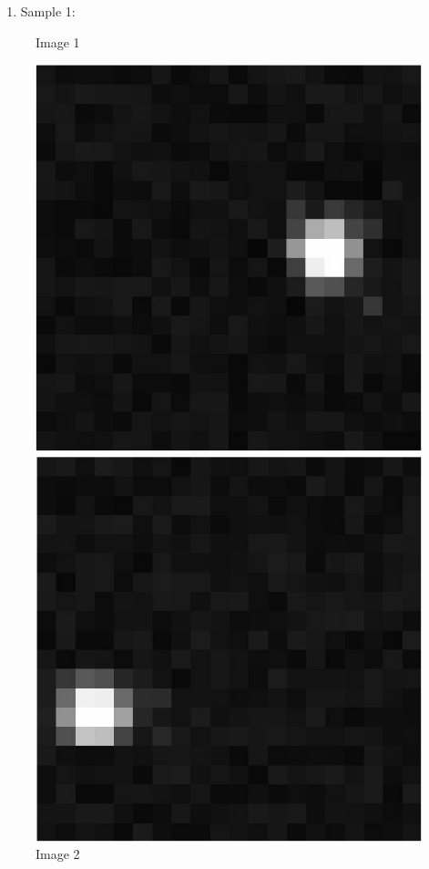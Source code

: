 \documentclass[paper=a4, fontsize=11pt]{scrartcl}
\numberwithin{equation}{section}		%
\numberwithin{figure}{section}			%
\numberwithin{table}{section}				%
\begin{document}
\begin{enumerate}
\item  Sample 1:
\end{enumerate}
\begin{figure}[!tbp]
  \centering
  \begin{minipage}[b]{0.4\textwidth}
    \caption{Image 1}
    \includegraphics[width=\textwidth]{sample1}
  \end{minipage}
  \hfill
  \begin{minipage}[b]{0.4\textwidth}
    \caption{Image 2}
    \includegraphics[width=\textwidth]{sample2}
  \end{minipage}
\end {figure}
\end{document}
